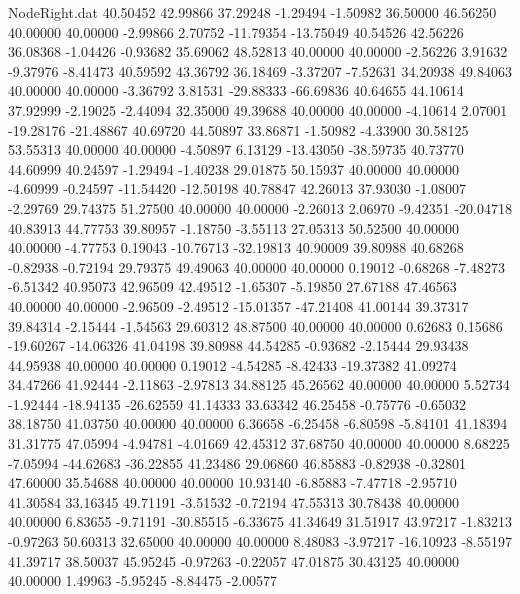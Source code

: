 \begin{filecontents}{NodeRight.dat}
  40.50452   42.99866   37.29248    -1.29494   -1.50982   36.50000   46.56250   40.00000   40.00000   -2.99866    2.70752  -11.79354  -13.75049
  40.54526   42.56226   36.08368    -1.04426   -0.93682   35.69062   48.52813   40.00000   40.00000   -2.56226    3.91632   -9.37976   -8.41473
  40.59592   43.36792   36.18469    -3.37207   -7.52631   34.20938   49.84063   40.00000   40.00000   -3.36792    3.81531  -29.88333  -66.69836
  40.64655   44.10614   37.92999    -2.19025   -2.44094   32.35000   49.39688   40.00000   40.00000   -4.10614    2.07001  -19.28176  -21.48867
  40.69720   44.50897   33.86871    -1.50982   -4.33900   30.58125   53.55313   40.00000   40.00000   -4.50897    6.13129  -13.43050  -38.59735
  40.73770   44.60999   40.24597    -1.29494   -1.40238   29.01875   50.15937   40.00000   40.00000   -4.60999   -0.24597  -11.54420  -12.50198
  40.78847   42.26013   37.93030    -1.08007   -2.29769   29.74375   51.27500   40.00000   40.00000   -2.26013    2.06970   -9.42351  -20.04718
  40.83913   44.77753   39.80957    -1.18750   -3.55113   27.05313   50.52500   40.00000   40.00000   -4.77753    0.19043  -10.76713  -32.19813
  40.90009   39.80988   40.68268    -0.82938   -0.72194   29.79375   49.49063   40.00000   40.00000    0.19012   -0.68268   -7.48273   -6.51342
  40.95073   42.96509   42.49512    -1.65307   -5.19850   27.67188   47.46563   40.00000   40.00000   -2.96509   -2.49512  -15.01357  -47.21408
  41.00144   39.37317   39.84314    -2.15444   -1.54563   29.60312   48.87500   40.00000   40.00000    0.62683    0.15686  -19.60267  -14.06326
  41.04198   39.80988   44.54285    -0.93682   -2.15444   29.93438   44.95938   40.00000   40.00000    0.19012   -4.54285   -8.42433  -19.37382
  41.09274   34.47266   41.92444    -2.11863   -2.97813   34.88125   45.26562   40.00000   40.00000    5.52734   -1.92444  -18.94135  -26.62559
  41.14333   33.63342   46.25458    -0.75776   -0.65032   38.18750   41.03750   40.00000   40.00000    6.36658   -6.25458   -6.80598   -5.84101
  41.18394   31.31775   47.05994    -4.94781   -4.01669   42.45312   37.68750   40.00000   40.00000    8.68225   -7.05994  -44.62683  -36.22855
  41.23486   29.06860   46.85883    -0.82938   -0.32801   47.60000   35.54688   40.00000   40.00000   10.93140   -6.85883   -7.47718   -2.95710
  41.30584   33.16345   49.71191    -3.51532   -0.72194   47.55313   30.78438   40.00000   40.00000    6.83655   -9.71191  -30.85515   -6.33675
  41.34649   31.51917   43.97217    -1.83213   -0.97263   50.60313   32.65000   40.00000   40.00000    8.48083   -3.97217  -16.10923   -8.55197
  41.39717   38.50037   45.95245    -0.97263   -0.22057   47.01875   30.43125   40.00000   40.00000    1.49963   -5.95245   -8.84475   -2.00577

\end{filecontents}
